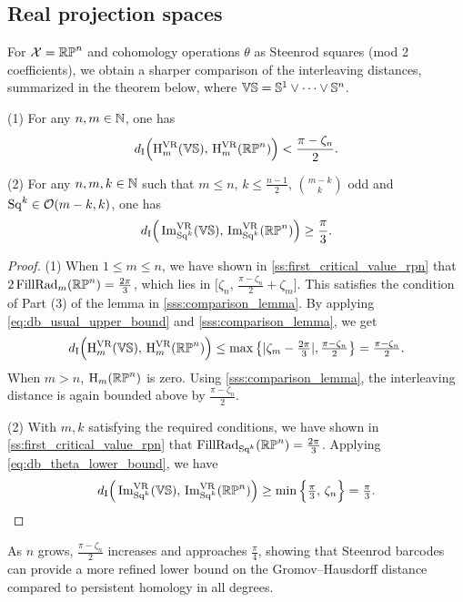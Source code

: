 \subsection{Real projection spaces}
\label{ss:distance_estimate_rpn}

For \(\mathcal{X} = \mathbb{RP}^n\) and cohomology operations \(\theta\) as Steenrod squares (mod 2 coefficients), we obtain a sharper comparison of the interleaving distances, summarized in the theorem below, where \(\mathbb{V}\mathbb{S} = \mathbb{S}^1 \vee \dots \vee \mathbb{S}^n\).

\medskip \theorem 
(1) For any \(n,m \in \mathbb{N}\), one has
\[
d_{\mathrm{I}}\Big(\mathrm{H}^{\mathrm{VR}}_m(\mathbb{V}\mathbb{S}),\, \mathrm{H}^{\mathrm{VR}}_m(\mathbb{RP}^n)\Big) < \frac{\pi-\zeta_n}{2}.
\]

(2) For any \(n,m,k \in \mathbb{N}\) such that $m \leq n,\, k \leq \tfrac{n-1}{2},\, \binom{m-k}{k}$ odd and $\operatorname{Sq}^k\in \mathcal{O}(m-k, k)$, one has
\[
d_{\mathrm{I}}\Big(\operatorname{Im}_{\operatorname{Sq}^k}^{\mathrm{VR}}(\mathbb{V}\mathbb{S}),\, \operatorname{Im}_{\operatorname{Sq}^k}^{\mathrm{VR}}(\mathbb{RP}^n)\Big) \geq \frac{\pi}{3}.
\]

\begin{proof}
    (1) %
    When $1 \leq m \leq n$, we have shown in \cref{ss:first_critical_value_rpn} that
    $2\operatorname{FillRad}_{m}(\mathbb{RP}^n) = \tfrac{2\pi}{3}$, which lies in $\big[\zeta_n,\, \tfrac{\pi - \zeta_n}{2}+\zeta_m\big]$.
    This satisfies the condition of Part (3) of the lemma in \cref{sss:comparison_lemma}.
	By applying \cref{eq:db_usual_upper_bound} and \cref{sss:comparison_lemma}, we get
	\[d_{\mathrm{I}}\Big(\mathrm{H}^{\mathrm{VR}}_m(\mathbb{V}\mathbb{S}),\, \mathrm{H}^{\mathrm{VR}}_m(\mathbb{RP}^n)\Big)
    \leq 
    \max \big\{ |\zeta_m  - \tfrac{2\pi}{3} |, \tfrac{\pi - \zeta_n}{2} \big\}
    = \tfrac{\pi - \zeta_n}{2}.\]
    When $m > n$, $\mathrm{H}_m(\mathbb{RP}^n)$ is zero. 
    Using \cref{sss:comparison_lemma}, the interleaving distance is again bounded above by $\tfrac{\pi - \zeta_n}{2}$. 
    
    (2) With $m,k$ satisfying the required conditions, we have shown in \cref{ss:first_critical_value_rpn} that
	$\operatorname{FillRad}_{\operatorname{Sq}^k}(\mathbb{RP}^n) = \tfrac{2\pi}{3}$.
    Applying \cref{eq:db_theta_lower_bound}, we have
	\[d_{\mathrm{I}}\Big(\operatorname{Im}_{\operatorname{Sq}^k}^{\mathrm{VR}}(\mathbb{V}\mathbb{S}),\, \operatorname{Im}_{\operatorname{Sq}^k}^{\mathrm{VR}}(\mathbb{RP}^n)\Big)
	\geq \min\Big\{\tfrac{\pi}{3},\, \zeta_n\Big\}
	= \tfrac{\pi}{3}.\qedhere
    \]
\end{proof}

As \(n\) grows, \(\tfrac{\pi - \zeta_n}{2}\) increases and approaches \(\tfrac{\pi}{4}\), showing that Steenrod barcodes can provide a more refined lower bound on the Gromov--Hausdorff distance compared to persistent homology in all degrees.